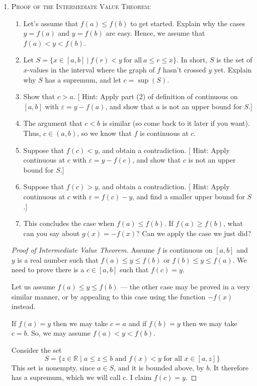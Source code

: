 \documentclass[12pt]{amsart}
\def\e{\varepsilon}
\newcommand{\R}{{\mathbb{R}}}
\numberwithin{equation}{section}
\theoremstyle{plain} %
\theoremstyle{definition}
\theoremstyle{remark}
\begin{document}
\begin{enumerate}
\item \textsc{Proof of the Intermediate Value Theorem:}
\begin{enumerate}
\item Let's assume that $f(a) \leq f(b)$ to get started. Explain why the cases $y=f(a)$ and $y=f(b)$ are easy. Hence, we assume that $f(a)< y < f(b)$.
\item Let $S=\{ x\in [a,b] \ | \ f(r) < y \ \text{for all} \ a\leq r \leq x \}$. In short, $S$ is the set of $x$-values in the interval where the graph of $f$ hasn't crossed $y$ yet. Explain why $S$ has a supremum, and let $c= \sup(S)$.
\item Show that $c >a$. [ Hint: Apply part (2) of definition of continuous on $[a,b]$ with $\e = y-f(a)$, and show that $a$ is not an upper bound for $S$.]
\item The argument that $c<b$ is similar (so come back to it later if you want). Thus, $c\in (a,b)$, so we know that $f$ is continuous at $c$.
\item Suppose that $f(c)<y$, and obtain a contradiction. [ Hint: Apply continuous at $c$ with $\e= y-f(c)$, and show that $c$ is not an upper bound for $S$.]
\item Suppose that $f(c)>y$, and obtain a contradiction. [ Hint: Apply continuous at $c$ with $\e= f(c)-y$, and find a smaller upper bound for $S$.]
\item This concludes the case when $f(a) \leq f(b)$. If $f(a) \geq f(b)$, what can you say about $g(x) = -f(x)$? Can we apply the case we just did?
\end{enumerate}

\begin{framed}
\begin{proof}[Proof of Intermediate Value Theorem] Assume $f$ is continuous on $[a,b]$ and $y$ is a real
  number such that  $f(a) \leq y \leq f(b)$ or $f(b) \leq y \leq f(a)$. We need to prove there is a $c \in [a,b]$ such that $f(c) = y$.

  Let us assume $f(a) \leq y \leq f(b)$ --- the other case may be proved in a very similar manner, or by appealing to this case using the function $-f(x)$ instead.
  
 If $f(a) = y$ then we may take $c = a$ and if $f(b) = y$ then we may take $c = b$. So, we may assume $f(a) < y < f(b)$.

Consider the set 
$$
S = \{z \in \R \mid a \leq z \leq b \text{ and $f(x) < y$ for all $x \in [a, z]$}\}
$$
This set is nonempty, since $a \in S$, and it is bounded above, by $b$. It therefore has a supremum,
which we will call $c$. I claim $f(c) = y$.






\end{proof}
\end{framed}
\end{enumerate}
\end{document}
